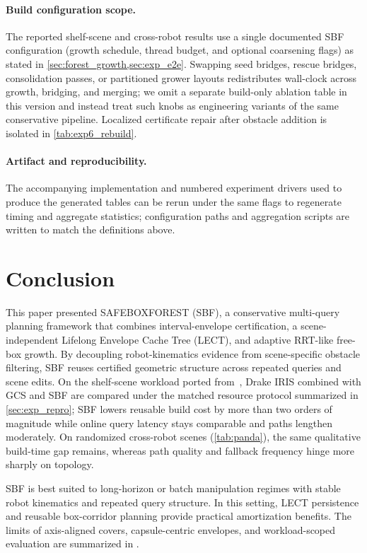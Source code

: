 \documentclass[journal]{IEEEtran}
\DeclareRobustCommand{\textsc}[1]{\textnormal{\MakeUppercase{#1}}}
\newcommand{\sbf}{\textsc{SBF}}
\begin{document}
\paragraph{Build configuration scope.}
The reported shelf-scene and cross-robot results use a single documented SBF configuration (growth schedule, thread budget, and optional coarsening flags) as stated in \cref{sec:forest_growth,sec:exp_e2e}.
Swapping seed bridges, rescue bridges, consolidation passes, or partitioned grower layouts redistributes wall-clock across growth, bridging, and merging; we omit a separate build-only ablation table in this version and instead treat such knobs as engineering variants of the same conservative pipeline.
Localized certificate repair after obstacle addition is isolated in \cref{tab:exp6_rebuild}.

\paragraph{Artifact and reproducibility.}
The accompanying implementation and numbered experiment drivers used to produce
the generated tables can be rerun under the same flags to regenerate timing and
aggregate statistics; configuration paths and aggregation scripts are written to
match the definitions above.

\section{Conclusion}\label{sec:conclusion}

This paper presented \textsc{SafeBoxForest} (\sbf{}), a conservative multi-query
planning framework that combines interval-envelope certification, a scene-independent
Lifelong Envelope Cache Tree (LECT), and adaptive RRT-like free-box growth.
By decoupling robot-kinematics evidence from scene-specific obstacle filtering,
SBF reuses certified geometric structure across repeated queries and scene edits.
On the shelf-scene workload ported from~\cite{marcucci2023motion}, Drake IRIS combined with GCS and SBF are compared under the matched resource protocol summarized in \cref{sec:exp_repro}; SBF lowers reusable build cost by more than two orders of magnitude while online query latency stays comparable and paths lengthen moderately.
On randomized cross-robot scenes (\cref{tab:panda}), the same qualitative build-time gap remains, whereas path quality and fallback frequency hinge more sharply on topology.

\sbf{} is best suited to long-horizon or batch manipulation regimes with stable
robot kinematics and repeated query structure. In this setting, LECT persistence
and reusable box-corridor planning provide practical amortization benefits. The
limits of axis-aligned covers, capsule-centric envelopes, and workload-scoped
evaluation are summarized in .
\end{document}
